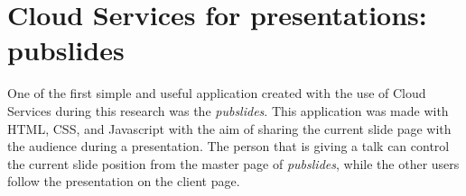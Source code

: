 %
%
%
%


\section{Cloud Services for presentations: pubslides}
\label{apesec:apppubslides}

One of the first simple and useful application created with the use of Cloud Services during this research was the \textit{pubslides}.
This application was made with HTML, CSS, and Javascript with the aim of sharing the current slide page with the audience during a presentation.
The person that is giving a talk can control the current slide position from the master page of \textit{pubslides}, while the other users follow the presentation on the client page.

